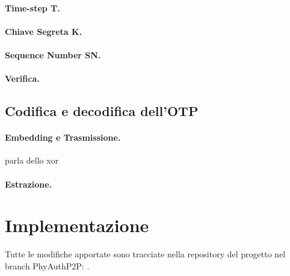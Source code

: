 \paragraph{Time-step T.}
\paragraph{Chiave Segreta K.}
\paragraph{Sequence Number SN.}
\paragraph{Verifica.}


\subsection{Codifica e decodifica dell'OTP}

\paragraph{Embedding e Trasmissione.}
parla dello \gls{xor}
\paragraph{Estrazione.}



\section{Implementazione}






Tutte le modifiche apportate sono tracciate nella repository del progetto nel branch PhyAuthP2P: \cite{site:openvlc-pa-github}.